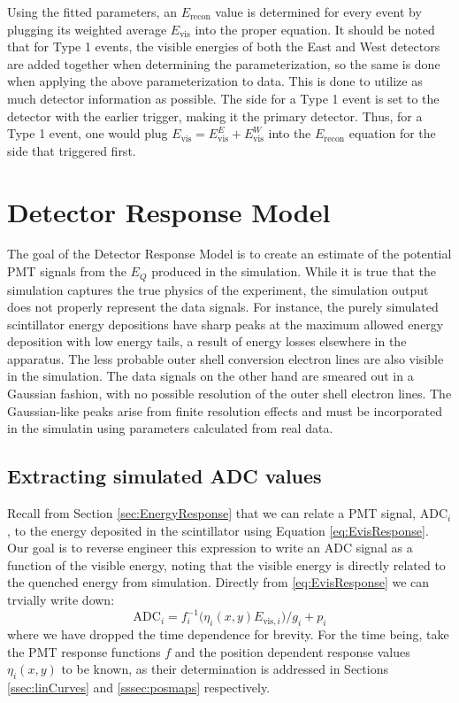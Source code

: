 Using the fitted parameters, an $E_{\mathrm{recon}}$ value is determined
for every event by plugging its weighted average $E_{\mathrm{vis}}$ into the proper equation.
It should be noted that for Type 1 events, the visible energies of both the East and West
detectors are added together when determining the parameterization, so
the same is done when applying the above parameterization to data. This is done to utilize as much
detector information as possible. The side for a Type 1 event is set to
the detector with the earlier trigger, making it the primary detector.
Thus, for a Type 1
event, one would plug $E_{\mathrm{vis}} = E_{\mathrm{vis}}^E + E_{\mathrm{vis}}^W$ into the $E_{\mathrm{recon}}$
equation for the side that triggered first.

\section{Detector Response Model} \label{sec:DetectorResponseModel}
The goal of the Detector Response Model is to create an estimate of the potential PMT
signals from the $E_Q$ produced in the simulation. While it is true that the simulation
captures the true physics of the experiment, the simulation output does not properly
represent the data signals.
For instance, the purely simulated scintillator energy depositions have sharp peaks at the
maximum allowed energy deposition with low
energy tails, a result of energy losses elsewhere in the apparatus. The less probable outer shell
conversion electron lines are also visible in the simulation. The data signals
on the other hand are smeared out in a Gaussian fashion, with no possible
resolution of the outer shell electron lines.
The Gaussian-like peaks arise from finite resolution effects and
must be incorporated in the simulatin using parameters calculated
from real data.  


\subsection{Extracting simulated ADC values}


Recall from Section \ref{sec:EnergyResponse} that we can relate a PMT signal,
$\mathrm{ADC}_i$, to the energy deposited in the scintillator
using Equation \ref{eq:EvisResponse}.
Our goal is to reverse engineer this expression to write an ADC signal as a
function of the visible energy, noting that the visible energy is directly
related to the quenched energy from simulation. Directly from \ref{eq:EvisResponse}
we can trvially write down:
%
\begin{equation} \label{eq:pmtResponse}
\mathrm{ADC}_i = f_i^{-1}\big(\eta_i(x,y) E_{\mathrm{vis},i} \big)/g_i + p_i
\end{equation}
%
where we have dropped the time dependence for brevity. For the time being, take
the PMT response functions $f$ and the position dependent response values $\eta_i(x,y)$ to be known,
as their determination is addressed in Sections \ref{ssec:linCurves} and \ref{sssec:posmaps}
respectively.


